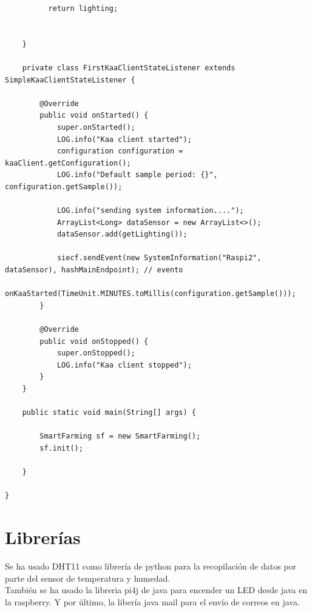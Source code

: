 \documentclass[12pt, twoside]{book}
\begin{document}
\begin{appendices}
\begin{lstlisting}
		  return lighting;


	}

	private class FirstKaaClientStateListener extends SimpleKaaClientStateListener {

		@Override
		public void onStarted() {
			super.onStarted();
			LOG.info("Kaa client started");
			configuration configuration = kaaClient.getConfiguration();
			LOG.info("Default sample period: {}", configuration.getSample());

			LOG.info("sending system information....");
			ArrayList<Long> dataSensor = new ArrayList<>();
			dataSensor.add(getLighting());

			siecf.sendEvent(new SystemInformation("Raspi2", dataSensor), hashMainEndpoint); // evento
			onKaaStarted(TimeUnit.MINUTES.toMillis(configuration.getSample()));
		}

		@Override
		public void onStopped() {
			super.onStopped();
			LOG.info("Kaa client stopped");
		}
	}

	public static void main(String[] args) {

		SmartFarming sf = new SmartFarming();
		sf.init();

	}

}
\end{lstlisting}
\section{Librerías}
Se ha usado DHT11\cite{python_library_dht11} como librería de python para la recopilación de datos por parte del sensor de temperatura y humedad.\\
También se ha usado la libreria pi4j\cite{pi4j} de java para encender un LED desde java en la raspberry. Y por último, la libería java mail\cite{javamail} para el envío de correos en java.
\end{appendices}
\end{document}
